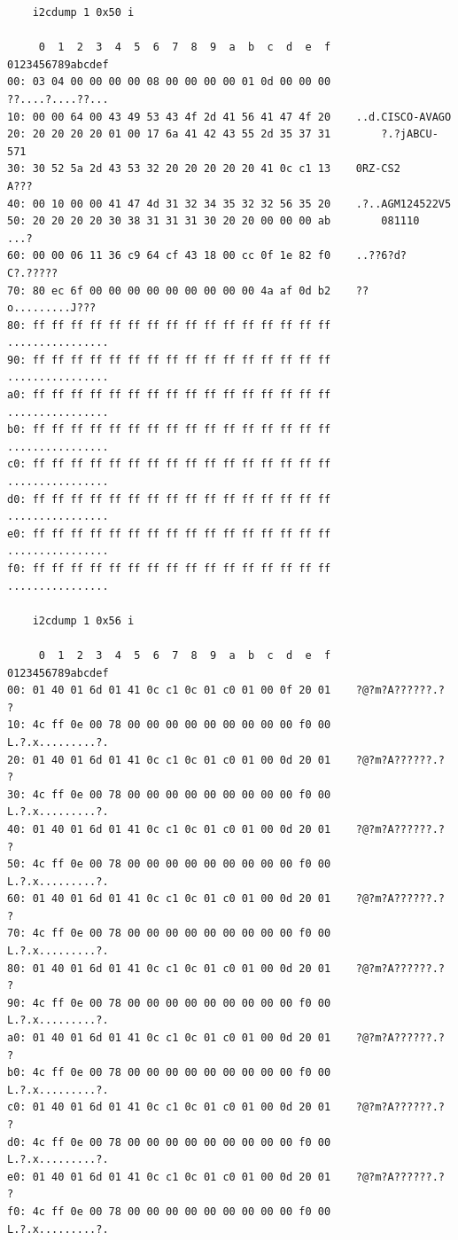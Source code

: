 \begin{lstlisting}
	i2cdump 1 0x50 i

     0  1  2  3  4  5  6  7  8  9  a  b  c  d  e  f    0123456789abcdef
00: 03 04 00 00 00 00 08 00 00 00 00 01 0d 00 00 00    ??....?....??...
10: 00 00 64 00 43 49 53 43 4f 2d 41 56 41 47 4f 20    ..d.CISCO-AVAGO 
20: 20 20 20 20 01 00 17 6a 41 42 43 55 2d 35 37 31        ?.?jABCU-571
30: 30 52 5a 2d 43 53 32 20 20 20 20 20 41 0c c1 13    0RZ-CS2     A???
40: 00 10 00 00 41 47 4d 31 32 34 35 32 32 56 35 20    .?..AGM124522V5 
50: 20 20 20 20 30 38 31 31 31 30 20 20 00 00 00 ab        081110  ...?
60: 00 00 06 11 36 c9 64 cf 43 18 00 cc 0f 1e 82 f0    ..??6?d?C?.?????
70: 80 ec 6f 00 00 00 00 00 00 00 00 00 4a af 0d b2    ??o.........J???
80: ff ff ff ff ff ff ff ff ff ff ff ff ff ff ff ff    ................
90: ff ff ff ff ff ff ff ff ff ff ff ff ff ff ff ff    ................
a0: ff ff ff ff ff ff ff ff ff ff ff ff ff ff ff ff    ................
b0: ff ff ff ff ff ff ff ff ff ff ff ff ff ff ff ff    ................
c0: ff ff ff ff ff ff ff ff ff ff ff ff ff ff ff ff    ................
d0: ff ff ff ff ff ff ff ff ff ff ff ff ff ff ff ff    ................
e0: ff ff ff ff ff ff ff ff ff ff ff ff ff ff ff ff    ................
f0: ff ff ff ff ff ff ff ff ff ff ff ff ff ff ff ff    ................

	i2cdump 1 0x56 i

     0  1  2  3  4  5  6  7  8  9  a  b  c  d  e  f    0123456789abcdef
00: 01 40 01 6d 01 41 0c c1 0c 01 c0 01 00 0f 20 01    ?@?m?A??????.? ?
10: 4c ff 0e 00 78 00 00 00 00 00 00 00 00 00 f0 00    L.?.x.........?.
20: 01 40 01 6d 01 41 0c c1 0c 01 c0 01 00 0d 20 01    ?@?m?A??????.? ?
30: 4c ff 0e 00 78 00 00 00 00 00 00 00 00 00 f0 00    L.?.x.........?.
40: 01 40 01 6d 01 41 0c c1 0c 01 c0 01 00 0d 20 01    ?@?m?A??????.? ?
50: 4c ff 0e 00 78 00 00 00 00 00 00 00 00 00 f0 00    L.?.x.........?.
60: 01 40 01 6d 01 41 0c c1 0c 01 c0 01 00 0d 20 01    ?@?m?A??????.? ?
70: 4c ff 0e 00 78 00 00 00 00 00 00 00 00 00 f0 00    L.?.x.........?.
80: 01 40 01 6d 01 41 0c c1 0c 01 c0 01 00 0d 20 01    ?@?m?A??????.? ?
90: 4c ff 0e 00 78 00 00 00 00 00 00 00 00 00 f0 00    L.?.x.........?.
a0: 01 40 01 6d 01 41 0c c1 0c 01 c0 01 00 0d 20 01    ?@?m?A??????.? ?
b0: 4c ff 0e 00 78 00 00 00 00 00 00 00 00 00 f0 00    L.?.x.........?.
c0: 01 40 01 6d 01 41 0c c1 0c 01 c0 01 00 0d 20 01    ?@?m?A??????.? ?
d0: 4c ff 0e 00 78 00 00 00 00 00 00 00 00 00 f0 00    L.?.x.........?.
e0: 01 40 01 6d 01 41 0c c1 0c 01 c0 01 00 0d 20 01    ?@?m?A??????.? ?
f0: 4c ff 0e 00 78 00 00 00 00 00 00 00 00 00 f0 00    L.?.x.........?.
\end{lstlisting}

